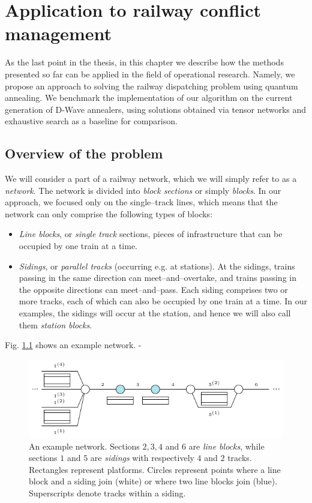\chapter[Railway conflict management]{Application to railway conflict management}
\label{chapter:trains}
As the last point in the thesis, in this chapter we describe how the methods
presented so far can be applied in the field of operational research. Namely,
we propose an approach to solving the railway dispatching problem using quantum
annealing. We benchmark the implementation of our algorithm on the current
generation of D-Wave annealers, using solutions obtained via tensor networks
and exhaustive search as a baseline for comparison.

\section{Overview of the problem}
We will consider a part of a railway network, which we will simply refer to as
a \emph{network}. The network is divided into \emph{block sections} or simply
\emph{blocks}. In our approach, we focused only on the single--track lines,
which means that the network can only comprise the following types of blocks:
\begin{itemize}
  \item \emph{Line blocks}, or \emph{single track} sections, pieces of infrastructure that can be occupied by one train
    at a time.
  \item \emph{Sidings}, or \emph{parallel tracks} (occurring e.g. at stations). At the sidings,
    trains passing in the same direction can meet--and--overtake, and trains passing
    in the opposite directions can meet--and--pass. Each siding comprises two or more
    tracks, each of which can also be occupied by one train at a time. In our examples, the
    sidings will occur at the station, and hence we will also call them \emph{station blocks}.
\end{itemize}
Fig. \ref{fig:railway-network} shows an example network. -
\begin{figure}[ht]
  \includegraphics[width=\textwidth]{figures/example_line}
  \caption{
    An example network. Sections $2, 3, 4$ and $6$ are \emph{line blocks}, while
    sections $1$ and $5$ are \emph{sidings} with respectively $4$ and $2$ tracks.
    Rectangles represent platforms. Circles represent points where a line block and
    a siding join (white) or where two line blocks join (blue). Superscripts denote
    tracks within a siding. } \label{fig:railway-network}
\end{figure}

